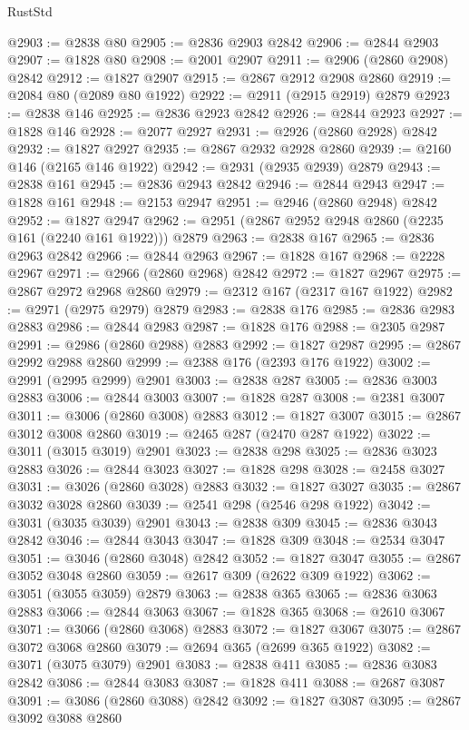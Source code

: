 \begin{lexlean}{RustStd}
\begin{coremodule}
@2903 := @2838 @80
@2905 := @2836 @2903 @2842
@2906 := @2844 @2903
@2907 := @1828 @80
@2908 := @2001 @2907
@2911 := @2906 (@2860 @2908) @2842
@2912 := @1827 @2907
@2915 := @2867 @2912 @2908 @2860
@2919 := @2084 @80 (@2089 @80 @1922)
@2922 := @2911 (@2915 @2919) @2879
@2923 := @2838 @146
@2925 := @2836 @2923 @2842
@2926 := @2844 @2923
@2927 := @1828 @146
@2928 := @2077 @2927
@2931 := @2926 (@2860 @2928) @2842
@2932 := @1827 @2927
@2935 := @2867 @2932 @2928 @2860
@2939 := @2160 @146 (@2165 @146 @1922)
@2942 := @2931 (@2935 @2939) @2879
@2943 := @2838 @161
@2945 := @2836 @2943 @2842
@2946 := @2844 @2943
@2947 := @1828 @161
@2948 := @2153 @2947
@2951 := @2946 (@2860 @2948) @2842
@2952 := @1827 @2947
@2962 := @2951 (@2867 @2952 @2948 @2860 (@2235 @161 (@2240 @161 @1922))) @2879
@2963 := @2838 @167
@2965 := @2836 @2963 @2842
@2966 := @2844 @2963
@2967 := @1828 @167
@2968 := @2228 @2967
@2971 := @2966 (@2860 @2968) @2842
@2972 := @1827 @2967
@2975 := @2867 @2972 @2968 @2860
@2979 := @2312 @167 (@2317 @167 @1922)
@2982 := @2971 (@2975 @2979) @2879
@2983 := @2838 @176
@2985 := @2836 @2983 @2883
@2986 := @2844 @2983
@2987 := @1828 @176
@2988 := @2305 @2987
@2991 := @2986 (@2860 @2988) @2883
@2992 := @1827 @2987
@2995 := @2867 @2992 @2988 @2860
@2999 := @2388 @176 (@2393 @176 @1922)
@3002 := @2991 (@2995 @2999) @2901
@3003 := @2838 @287
@3005 := @2836 @3003 @2883
@3006 := @2844 @3003
@3007 := @1828 @287
@3008 := @2381 @3007
@3011 := @3006 (@2860 @3008) @2883
@3012 := @1827 @3007
@3015 := @2867 @3012 @3008 @2860
@3019 := @2465 @287 (@2470 @287 @1922)
@3022 := @3011 (@3015 @3019) @2901
@3023 := @2838 @298
@3025 := @2836 @3023 @2883
@3026 := @2844 @3023
@3027 := @1828 @298
@3028 := @2458 @3027
@3031 := @3026 (@2860 @3028) @2883
@3032 := @1827 @3027
@3035 := @2867 @3032 @3028 @2860
@3039 := @2541 @298 (@2546 @298 @1922)
@3042 := @3031 (@3035 @3039) @2901
@3043 := @2838 @309
@3045 := @2836 @3043 @2842
@3046 := @2844 @3043
@3047 := @1828 @309
@3048 := @2534 @3047
@3051 := @3046 (@2860 @3048) @2842
@3052 := @1827 @3047
@3055 := @2867 @3052 @3048 @2860
@3059 := @2617 @309 (@2622 @309 @1922)
@3062 := @3051 (@3055 @3059) @2879
@3063 := @2838 @365
@3065 := @2836 @3063 @2883
@3066 := @2844 @3063
@3067 := @1828 @365
@3068 := @2610 @3067
@3071 := @3066 (@2860 @3068) @2883
@3072 := @1827 @3067
@3075 := @2867 @3072 @3068 @2860
@3079 := @2694 @365 (@2699 @365 @1922)
@3082 := @3071 (@3075 @3079) @2901
@3083 := @2838 @411
@3085 := @2836 @3083 @2842
@3086 := @2844 @3083
@3087 := @1828 @411
@3088 := @2687 @3087
@3091 := @3086 (@2860 @3088) @2842
@3092 := @1827 @3087
@3095 := @2867 @3092 @3088 @2860

\end{coremodule}
\end{lexlean}
